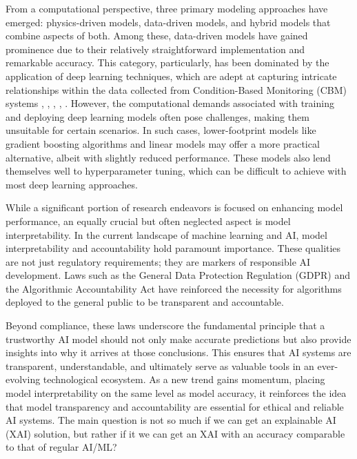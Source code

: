 \documentclass{IEEEtran}
\begin{document}
        From a computational perspective, three primary modeling approaches have emerged: physics-driven models, data-driven models, and hybrid models that combine aspects of both. Among these, data-driven models have gained prominence due to their relatively straightforward implementation and remarkable accuracy. This category, particularly, has been dominated by the application of deep learning techniques, which are adept at capturing intricate relationships within the data collected from Condition-Based Monitoring (CBM) systems \cite{data-driven-survey}, \cite{phm2021-1st-cnn}, \cite{phm2021-2nd-inception}, \cite{phm2021-3rd-stacked-cnn}, \cite{pi-dl-rul}. However, the computational demands associated with training and deploying deep learning models often pose challenges, making them unsuitable for certain scenarios. In such cases, lower-footprint models like gradient boosting algorithms and linear models may offer a more practical alternative, albeit with slightly reduced performance. These models also lend themselves well to hyperparameter tuning, which can be difficult to achieve with most deep learning approaches.

        While a significant portion of research endeavors is focused on enhancing model performance, an equally crucial but often neglected aspect is model interpretability. In the current landscape of machine learning and AI, model interpretability and accountability hold paramount importance. These qualities are not just regulatory requirements; they are markers of responsible AI development. Laws such as the General Data Protection Regulation (GDPR) \cite{gdpr-act} and the Algorithmic Accountability Act \cite{govinfo-2022} have reinforced the necessity for algorithms deployed to the general public to be transparent and accountable.

        Beyond compliance, these laws underscore the fundamental principle that a trustworthy AI model should not only make accurate predictions but also provide insights into why it arrives at those conclusions. This ensures that AI systems are transparent, understandable, and ultimately serve as valuable tools in an ever-evolving technological ecosystem. As a new trend gains momentum, placing model interpretability on the same level as model accuracy, it reinforces the idea that model transparency and accountability are essential for ethical and reliable AI systems. The main question is not so much if we can get an explainable AI (XAI) solution, but rather if it we can get an XAI with an accuracy comparable to that of regular AI/ML? \cite{angelov2021explainable}
\end{document}
